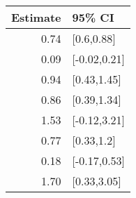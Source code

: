 \begin{tabular}{rl}
  \hline
Estimate & 95\% CI \\ 
  \hline
0.74 & [0.6,0.88] \\ 
  0.09 & [-0.02,0.21] \\ 
  0.94 & [0.43,1.45] \\ 
  0.86 & [0.39,1.34] \\ 
  1.53 & [-0.12,3.21] \\ 
  0.77 & [0.33,1.2] \\ 
  0.18 & [-0.17,0.53] \\ 
  1.70 & [0.33,3.05] \\ 
   \hline
\end{tabular}

